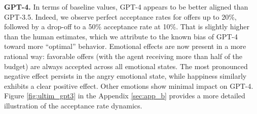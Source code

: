 \documentclass{article}
\begin{document}


\textbf{GPT-4.} In terms of baseline values, GPT-4 appears to be better aligned than GPT-3.5. Indeed, we observe perfect acceptance rates for offers up to 20\%, followed by a drop-off to a 50\% acceptance rate at 10\%. That is slightly higher than the human estimates, which we attribute to the known bias of GPT-4 toward more ``optimal'' behavior. Emotional effects are now present in a more rational way: favorable offers (with the agent receiving more than half of the budget) are always accepted across all emotional states. The most pronounced negative effect persists in the angry emotional state, while happiness similarly exhibits a clear positive effect. Other emotions show minimal impact on GPT-4. Figure \ref{fig:ultim_gpt3} in the Appendix \ref{sec:app_b} provides a more detailed illustration of the acceptance rate dynamics. 
\end{document}
